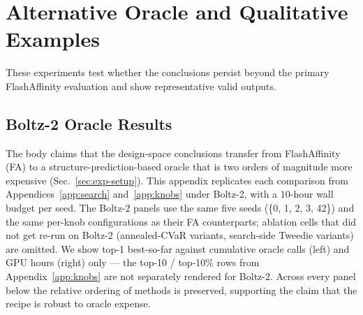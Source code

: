 \documentclass{article}
\begin{document}



\clearpage

\section{Alternative Oracle and Qualitative Examples}\label{app:external-validation}

These experiments test whether the conclusions persist beyond the primary FlashAffinity evaluation and show representative valid outputs.

\subsection{Boltz-2 Oracle Results}\label{app:boltz}

The body claims that the design-space conclusions transfer from FlashAffinity (FA) to a structure-prediction-based oracle that is two orders of magnitude more expensive (Sec.~\ref{sec:exp-setup}). This appendix replicates each comparison from Appendices~\ref{app:search} and~\ref{app:knobs} under Boltz-2, with a $10$-hour wall budget per seed. The Boltz-2 panels use the same five seeds (\{0, 1, 2, 3, 42\}) and the same per-knob configurations as their FA counterparts; ablation cells that did not get re-run on Boltz-2 (annealed-CVaR variants, search-side Tweedie variants) are omitted. We show top-1 best-so-far against cumulative oracle calls (left) and GPU hours (right) only --- the top-10 / top-10\% rows from Appendix~\ref{app:knobs} are not separately rendered for Boltz-2. Across every panel below the relative ordering of methods is preserved, supporting the claim that the recipe is robust to oracle expense.
\end{document}
